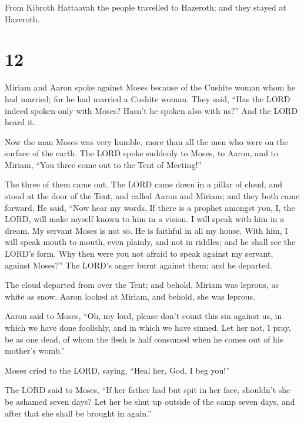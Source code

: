  From Kibroth Hattaavah the people travelled to Hazeroth;
and they stayed at Hazeroth.

\hypertarget{section-11}{%
\section{12}\label{section-11}}

 Miriam and Aaron spoke against Moses because of the
Cushite woman whom he had married; for he had married a Cushite woman.
 They said, ``Has the LORD indeed spoken only with Moses?
Hasn't he spoken also with us?'' And the LORD heard it.

 Now the man Moses was very humble, more than all the men
who were on the surface of the earth.  The LORD spoke
suddenly to Moses, to Aaron, and to Miriam, ``You three come out to the
Tent of Meeting!''

The three of them came out.  The LORD came down in a
pillar of cloud, and stood at the door of the Tent, and called Aaron and
Miriam; and they both came forward.  He said, ``Now hear
my words. If there is a prophet amongst you, I, the LORD, will make
myself known to him in a vision. I will speak with him in a dream.
 My servant Moses is not so. He is faithful in all my
house.  With him, I will speak mouth to mouth, even
plainly, and not in riddles; and he shall see the LORD's form. Why then
were you not afraid to speak against my servant, against Moses?''
 The LORD's anger burnt against them; and he departed.

 The cloud departed from over the Tent; and behold,
Miriam was leprous, as white as snow. Aaron looked at Miriam, and
behold, she was leprous.

 Aaron said to Moses, ``Oh, my lord, please don't count
this sin against us, in which we have done foolishly, and in which we
have sinned.  Let her not, I pray, be as one dead, of
whom the flesh is half consumed when he comes out of his mother's
womb.''

 Moses cried to the LORD, saying, ``Heal her, God, I beg
you!''

 The LORD said to Moses, ``If her father had but spit in
her face, shouldn't she be ashamed seven days? Let her be shut up
outside of the camp seven days, and after that she shall be brought in
again.''

